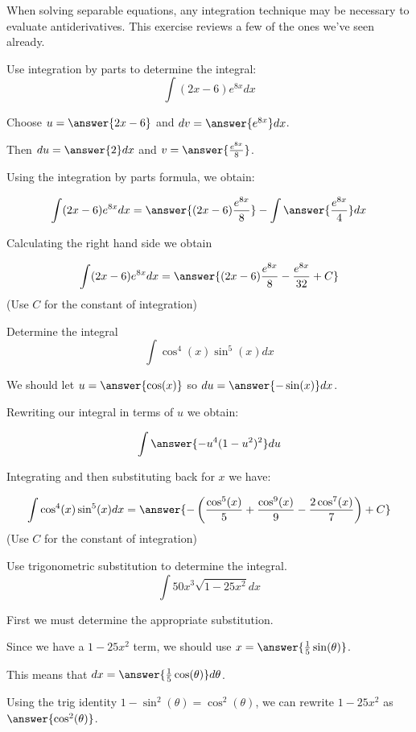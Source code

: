 \documentclass{ximera}
\author{Jim Talamo}
\begin{document}
\begin{exercise}
When solving separable equations, any integration technique may be necessary to evaluate antiderivatives.  This exercise reviews a few of the ones we've seen already.

\begin{exercise}
Use integration by parts to determine the integral:
\[
\int (2x-6) e^{8x} dx 
\]


Choose $u=\answer{ 2x-6}$ and $dv=\answer{e^{8x} } dx$. 

Then $du= \answer{ 2 } dx$ and $v= \answer{ \frac{e^{8x}}{8} }$.

Using the integration by parts formula, we obtain:

\[
\int (2x-6)e^{8x} dx= \answer{(2x-6)\frac{e^{8x}}{8}} - \int \answer{ \frac{e^{8x}}{4} } dx
\]

Calculating the right hand side we obtain

\[
\int (2x-6)e^{8x} dx= \answer{ (2x-6)\frac{e^{8x}}{8} - \frac{e^{8x}}{32} +C}
\]
(Use $C$ for the constant of integration)
\end{exercise}
\begin{exercise}
Determine the integral
\[
\int \cos^{4}(x) \sin^{5}(x) dx
\]

We should let $u=\answer{\cos(x)}$ so $du= \answer{ -\sin(x)} dx$. 

Rewriting our integral in terms of $u$ we obtain: 

\[
\int \answer{ -u^{4} (1-u^{2})^{2} }du
\]

Integrating and then substituting back for $x$ we have:

\[
\int \cos^{4}(x) \sin^{5}(x) dx=\answer{- \left( \frac{ \cos^{5}(x)}{5} + \frac{ \cos^{9}(x)}{9} -\frac{2 \cos^{7}(x)}{7} \right)+C }
\]
(Use $C$ for the constant of integration)
\end{exercise}
\begin{exercise}
Use trigonometric substitution to determine the integral.
\[
\int 50 x^{3} \sqrt{1-25x^{2}} dx
\]

First we must determine the appropriate substitution. 

Since we have a $1-25x^{2}$ term, we should use $x=\answer{\frac{1}{5}\sin(\theta)}$. 

This means that $dx= \answer{\frac{1}{5}\cos(\theta)} d\theta$. 

\begin{exercise}
Using the trig identity $1-\sin^{2}(\theta)=\cos^{2}(\theta)$, we can rewrite $1-25x^{2}$ as $\answer{\cos^{2}(\theta)}$. 


\end{exercise}
\end{exercise}
\end{exercise}
\end{document}
